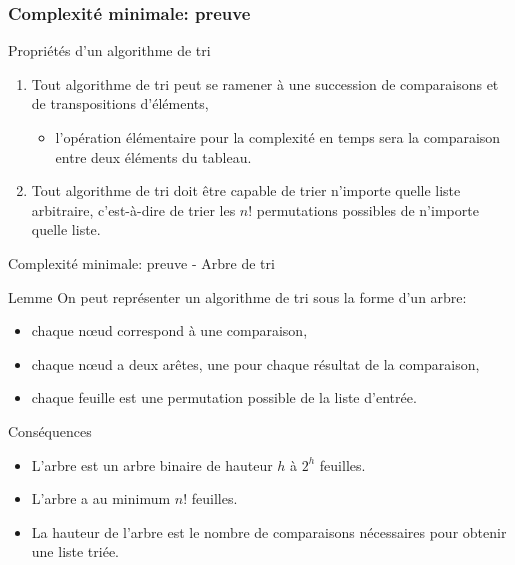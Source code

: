 \begin{frame}
\frametitle{Complexité minimale: preuve}
\begin{block}{Propriétés d'un algorithme de tri}
\begin{enumerate}
\item Tout algorithme de tri peut se ramener à une succession de comparaisons et de transpositions d'éléments,
	\begin{itemize}
		\item l'opération élémentaire pour la complexité en temps sera la comparaison entre deux éléments du tableau.
	\end{itemize}
\item Tout algorithme de tri doit être capable de trier n'importe quelle liste arbitraire, c'est-à-dire de trier les $n!$ permutations possibles de n'importe quelle liste.
\end{enumerate}
\end{block}
\end{frame}

\begin{frame}{Complexité minimale: preuve - Arbre de tri}
\begin{block}{Lemme}
  On peut représenter un algorithme de tri sous la forme d'un arbre:
  \begin{itemize}
	\item chaque nœud correspond à une comparaison,
	\item chaque nœud a deux arêtes, une pour chaque résultat de la comparaison,
	\item chaque feuille est une permutation possible de la liste d'entrée.
  \end{itemize}
\end{block}
\begin{block}{Conséquences}
  \begin{itemize}
  \item L'arbre est un arbre binaire de hauteur $h$ à $2^h$ feuilles.
  \item L'arbre a au minimum $n!$ feuilles.
  \item La hauteur de l'arbre est le nombre de comparaisons nécessaires pour obtenir une liste triée.
  \end{itemize}
\end{block}
\end{frame}

